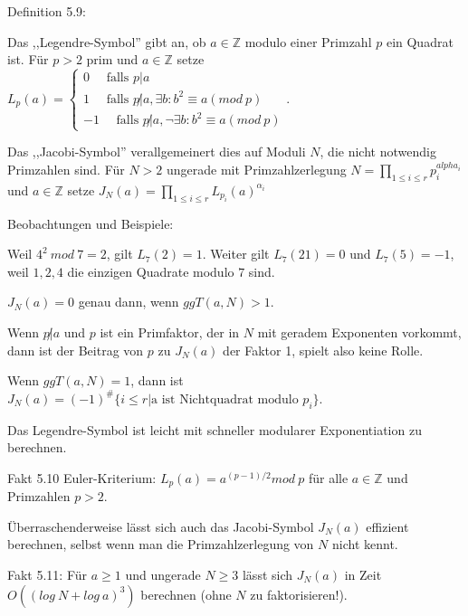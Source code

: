 \documentclass[a4paper]{article}
\begin{document}
\begin{multicols}{3}
        Definition 5.9:
        \begin{enumerate*}
            \item  Das ,,Legendre-Symbol'' gibt an, ob $a\in\mathbb{Z}$ modulo einer Primzahl $p$ ein Quadrat ist. Für $p>2$ prim und $a\in\mathbb{Z}$ setze $L_p(a) =\begin{cases} 0 \quad\text{ falls } p|a \\ 1 \quad\text{ falls } p\not|a, \exists b:b^2 \equiv a (mod\ p) \\ -1 \quad\text{ falls } p\not|a, \lnot\exists b:b^2 \equiv a (mod\ p)\end{cases}$.
            \item  Das ,,Jacobi-Symbol'' verallgemeinert dies auf Moduli $N$, die nicht notwendig Primzahlen sind. Für $N>2$ ungerade mit Primzahlzerlegung $N=\prod_{1\leq i\leq r} p^{alpha_i}_i$ und $a\in\mathbb{Z}$ setze $J_N(a) =\prod_{1 \leq i\leq r} L_{p_i}(a)^{\alpha_i}$
        \end{enumerate*}

        Beobachtungen und Beispiele:
        \begin{itemize*}
            \item Weil $4^2\ mod\ 7 = 2$, gilt $L_7(2) = 1$. Weiter gilt $L_7(21) = 0$ und $L_7(5) =-1$, weil $1,2,4$ die einzigen Quadrate modulo $7$ sind.
            \item $J_N(a) = 0$ genau dann, wenn $ggT(a,N)>1$.
            \item Wenn $p\not|a$ und $p$ ist ein Primfaktor, der in $N$ mit geradem Exponenten vorkommt, dann ist der Beitrag von $p$ zu $J_N(a)$ der Faktor 1, spielt also keine Rolle.
            \item Wenn $ggT(a,N) = 1$, dann ist $J_N(a) = (-1)^{\#}\{i\leq r|\text{a ist Nichtquadrat modulo } p_i\}$.
        \end{itemize*}

        Das Legendre-Symbol ist leicht mit schneller modularer Exponentiation zu berechnen.

        Fakt 5.10 Euler-Kriterium: $L_p(a) =a^{(p-1)/ 2}mod\ p$ für alle $a\in\mathbb{Z}$ und Primzahlen $p>2$.

        Überraschenderweise lässt sich auch das Jacobi-Symbol $J_N(a)$ effizient berechnen, selbst wenn man die Primzahlzerlegung von $N$ nicht kennt.

        Fakt 5.11: Für $a\geq 1$ und ungerade $N\geq 3$ lässt sich $J_N(a)$ in Zeit $O((log\ N+log\ a)^3)$ berechnen (ohne $N$ zu faktorisieren!).


\end{multicols}
\end{document}
